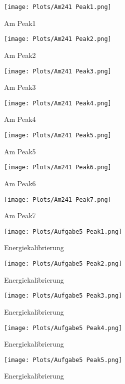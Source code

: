 \documentclass[]{article}
\begin{document}
\begin{figure}
	\centering
	\texttt{[image: Plots/Am241 Peak1.png]}
	\caption{Am Peak1}

\end{figure}
\begin{figure}
	\centering
	\texttt{[image: Plots/Am241 Peak2.png]}
	\caption{Am Peak2}

\end{figure}
\begin{figure}
	\centering
	\texttt{[image: Plots/Am241 Peak3.png]}
	\caption{Am Peak3}

\end{figure}
\begin{figure}
	\centering
	\texttt{[image: Plots/Am241 Peak4.png]}
	\caption{Am Peak4}

\end{figure}
\begin{figure}
	\centering
	\texttt{[image: Plots/Am241 Peak5.png]}
	\caption{Am Peak5}

\end{figure}
\begin{figure}
	\centering
	\texttt{[image: Plots/Am241 Peak6.png]}
	\caption{Am Peak6}

\end{figure}
\begin{figure}
	\centering
	\texttt{[image: Plots/Am241 Peak7.png]}
	\caption{Am Peak7}

\end{figure}
 \begin{figure}
 	\centering
 	\texttt{[image: Plots/Aufgabe5 Peak1.png]}
 	\caption{Energiekalibrierung}
 \end{figure}
  \begin{figure}
 	\centering
 	\texttt{[image: Plots/Aufgabe5 Peak2.png]}
 	\caption{Energiekalibrierung}
 \end{figure}
  \begin{figure}
 	\centering
 	\texttt{[image: Plots/Aufgabe5 Peak3.png]}
 	\caption{Energiekalibrierung}
 \end{figure}
 \begin{figure}
	\centering
	\texttt{[image: Plots/Aufgabe5 Peak4.png]}
	\caption{Energiekalibrierung}
\end{figure}
 \begin{figure}
	\centering
	\texttt{[image: Plots/Aufgabe5 Peak5.png]}
	\caption{Energiekalibrierung}
\end{figure}
\end{document}

